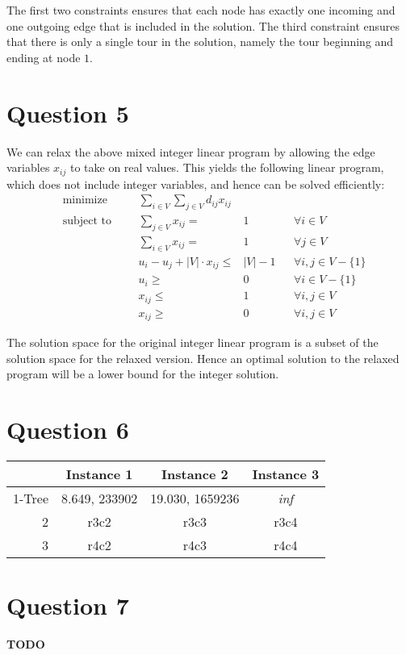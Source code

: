 \documentclass[a4paper, 10pt, oneside, article]{memoir}
\begin{document}
The first two constraints ensures that each node has exactly one
incoming and one outgoing edge that is included in the solution. The
third constraint ensures that there is only a single tour in the
solution, namely the tour beginning and ending at node $1$.


\section*{Question 5}

We can relax the above mixed integer linear program by allowing the
edge variables $x_{ij}$ to take on real values. This yields the
following linear program, which does not include integer variables,
and hence can be solved efficiently:
\begin{align*}
  &\text{minimize} &&& \sum_{i\in V} \sum_{j \in V} d_{ij} x_{ij} \\
  &\text{subject to} &&& \sum_{j \in V} x_{ij} ={}& 1 && \forall i \in V \\
  &                  &&& \sum_{i \in V} x_{ij} ={}& 1 && \forall j \in V \\
  &                  &&& u_i - u_j + |V| \cdot x_{ij} \leq{}& |V| - 1 && \forall i,j \in V - \{1\}  \\
  &                  &&& u_i \geq{}& 0 && \forall i \in V - \{1\} \\
  &                  &&& x_{ij} \leq{}& 1 && \forall i,j \in V \\
  &                  &&& x_{ij} \geq{}& 0 && \forall i,j \in V
\end{align*}

The solution space for the original integer linear program is a subset
of the solution space for the relaxed version. Hence an optimal
solution to the relaxed program will be a lower bound for the integer
solution.

\section*{Question 6}

\begin{tabular}{r | c c c }

 & Instance 1 & Instance 2 & Instance 3 \\
\hline
1-Tree & 8.649, 233902 & 19.030, 1659236 & \emph{inf} \\

2 & r3c2 & r3c3 & r3c4\\

3 & r4c2 & r4c3 & r4c4\\

\end{tabular}


\section*{Question 7}

\textbf{TODO}



\end{document}
